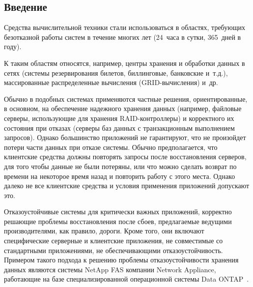\begin{multicols}{2}

\section{Введение}

{\nwt

Средства вычислительной техники стали использоваться в областях, требующих 
безотказной работы систем в течение многих лет (24~часа в сутки, 365~дней в 
году).

\label{st\stat}

{\renewcommand{\thefootnote}{\fnsymbol{footnote}}  
\renewcommand{\thefootnote}{\arabic{footnote}}}
  

К таким областям относятся, например, центры хранения и обработки
данных  в сетях (системы резервирования билетов, биллинговые,  банковские
и~т.д.), массированные распределенные вы\-чис\-ле\-ния (GRID-вычисления)
и~др.

\thispagestyle{headings}

Обычно в подобных системах применяются частные решения, ориентированные, в 
основном, на обеспечение надежного хранения данных (напри\-мер, файловые 
серверы, ис\-поль\-зу\-ющие для хранения RAID-контроллеры) и корректного их 
состояния при отказах (серверы баз данных с транзакционным выполнением 
запросов). Однако большинство приложений не гарантируют, что не произойдет 
потери части данных при отказе системы. Обычно предполагается, что клиентские 
средства должны повторять запросы после восстановления серверов, для того чтобы 
данные не были потеряны, или что можно сделать возврат по времени на некоторое 
время назад и повторить работу с этого места. Однако далеко не все клиентские 
средства и условия применения приложений допускают\linebreak
 это.

Отказоустойчивые системы для критически важных приложений, корректно
решающие проблемы восстановления после сбоев,   пред\-лагаемые ведущими
производителями, как правило, дороги. Кроме того, они включают
специфические серверные и клиентские приложения, не совместимые со
стандартными приложениями, не обеспечивающими отказоустойчивость.
Примером такого подхода к решению проблемы отказоустойчивости  хранения
данных являются системы NetApp FAS компании Network Appliance,
работающие на базе специализированной операционной системы Data
ONTAP~\cite{1zak}.

}
\end{multicols}
